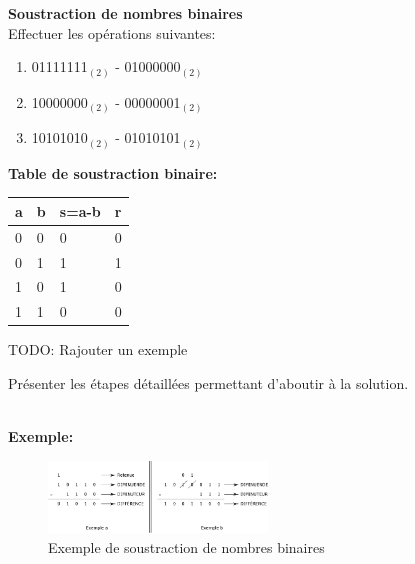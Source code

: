 \begin{Exercice}[15 minutes] \textbf{Soustraction de nombres binaires}\\
    Effectuer les opérations suivantes:

    \begin{enumerate}
        \item 01111111$_{(2)}$ - 01000000$_{(2)}$
        \item 10000000$_{(2)}$ - 00000001$_{(2)}$
        \item 10101010$_{(2)}$ - 01010101$_{(2)}$
    \end{enumerate}

    \begin{conseil}
        \textbf{Table de soustraction binaire:}\\
        \begin{tabular}{| C{0.1\textwidth} | C{0.1\textwidth} | C{0.1\textwidth} | C{0.1\textwidth} |} 
            \hline
            \textbf{a} & \textbf{b} & \textbf{s=a-b} & \textbf{r}\\ [0.5ex]
             & 0 & 0 & 0 \\ [0.5ex] 
             & 1 & 1 & 1 \\ [0.5ex] 
             & 0 & 1 & 0 \\ [0.5ex] 
             & 1 & 0 & 0 \\ [0.5ex] 
            \hline
        \end{tabular}
    \end{conseil}
    TODO: Rajouter un exemple
    \begin{solution}
        Présenter les étapes détaillées permettant d'aboutir à la solution.
    \end{solution}

    \textbf{\\ \faTerminal  Exemple:}
        \begin{figure}[h]
            \centering
            \includegraphics[width=0.52\textwidth]{img/substract.png}
            \caption{Exemple de soustraction de nombres binaires}
        \end{figure}

\end{Exercice}
\newpage
